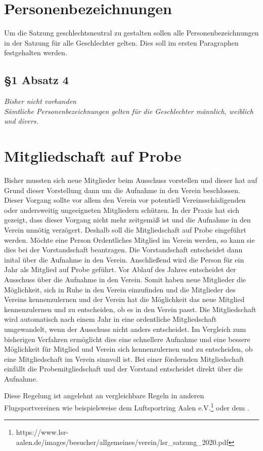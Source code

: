 \documentclass[10pt,a4paper,parskip=half]{scrartcl}
\newcommand{\compare}[3]{\subsection*{#1}\begin{multicols}{2}#2\columnbreak\\#3\end{multicols}}
\begin{document}
  \section{Personenbezeichnungen}
  Um die Satzung geschlechtsneutral zu gestalten sollen alle Personenbezeichnungen in der Satzung für alle Geschlechter gelten. Dies soll im ersten Paragraphen festgehalten werden.

  \compare{§1 Absatz 4}{\em Bisher nicht vorhanden \em}{Sämtliche Personenbezeichnungen gelten für die Geschlechter männlich, weiblich und divers.}


  \section{Mitgliedschaft auf Probe}
  Bisher mussten sich neue Mitglieder beim Ausschuss vorstellen und dieser hat auf Grund dieser Vorstellung dann um die Aufnahme in den Verein beschlossen. Dieser Vorgang sollte vor allem den Verein vor potentiell Vereinsschädigenden oder andersweitig ungeeigneten Mitgliedern schützen. In der Praxis hat sich gezeigt, dass dieser Vorgang nicht mehr zeitgemäß ist und die Aufnahme in den Verein unnötig verzögert. Deshalb soll die Mitgliedschaft auf Probe eingeführt werden. Möchte eine Person Ordentliches Mitglied im Verein werden, so kann sie dies bei der Vorstandschaft beantragen. Die Vorstandschaft entscheidet dann inital über die Aufnahme in den Verein. Anschließend wird die Person für ein Jahr als Mitglied auf Probe geführt. Vor Ablauf des Jahres entscheidet der Ausschuss über die Aufnahme in den Verein. Somit haben neue Mitglieder die Möglichkeit, sich in Ruhe in den Verein einzufinden und die Mitglieder des Vereins kennenzulernen und der Verein hat die Möglichkeit das neue Mitglied kennenzulernen und zu entscheiden, ob es in den Verein passt. Die Mitgliedschaft wird automatisch nach einem Jahr in eine ordentliche Mitgliedschaft umgewandelt, wenn der Ausschuss nicht anders entscheidet. Im Vergleich zum bisherigen Verfahren ermöglicht dies eine schnellere Aufnahme und eine bessere Möglichkeit für Mitglied und Verein sich kennenzulernen und zu entscheiden, ob eine Mitgliedschaft im Verein sinnvoll ist. Bei einer fördernden Mitgliedschaft einfällt die Probemitgliedschaft und der Vorstand entscheidet direkt über die Aufnahme.

  Diese Regelung ist angelehnt an vergleichbare Regeln in anderen Flugsportvereinen wie beispielsweise dem Luftsportring Aalen e.V.\footnote{https://www.lsr-aalen.de/images/besucher/allgemeines/verein/lsr\_satzung\_2020.pdf} oder dem .
\end{document}
